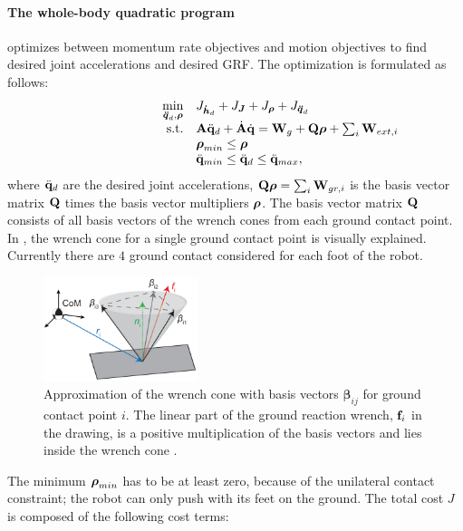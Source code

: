 \paragraph{The whole-body quadratic program} \cite{koolen2016design} optimizes between momentum rate objectives and motion objectives to find desired joint accelerations and desired \ac{GRF}. The optimization is formulated as follows:
\begin{equation}
\begin{array}{rlcl}
\displaystyle \min_{\bs{\ddot{q}}_d,\bs{\rho}} & \multicolumn{3}{l}{J_{\bs{\dot{h}}_d} + J_{\bs{J}} + J_{\bs{\rho}} + J_{\bs{\ddot{q}}_d} } \\%
\textrm{s.t.} & \matr{A}\ddqjntd + \dot{\matr{A}}\dqjnt = \matr{W}_g + \matr{Q}\bs{\rho}+\sum_i\matr{W}_{ext,i}\\
&\displaystyle \bs{\rho}_{min} \leq \bs{\rho}\\
&\ddot{\qjnt}_{min} \leq \ddqjntd \leq \ddot{\qjnt}_{max},
\end{array}
\end{equation}
where $\ddot{\mathbf{q}}_d$ are the desired joint accelerations, $\mathbf{Q}\boldsymbol{\rho} = \sum_i\mathbf{W}_{gr,i}$ is the basis vector matrix $\mathbf{Q}$ times the basis vector multipliers $\boldsymbol{\rho}$. The basis vector matrix $\mathbf{Q}$ consists of all basis vectors of the wrench cones from each ground contact point. In , the wrench cone for a single ground contact point is visually explained. Currently there are $4$ ground contact considered for each foot of the robot.
\begin{figure}
\centering
\includegraphics[width=0.4\textwidth]{STYLESTUFF/wrenchcone.png}
\caption{Approximation of the wrench cone with basis vectors $\boldsymbol{\beta}_{ij}$ for ground contact point $i$. The linear part of the ground reaction wrench, $\mathbf{f}_i$ in the drawing, is a positive multiplication of the basis vectors and lies inside the wrench cone \cite{koolen2016design}. }
\label{fig:wrenchcone}
\end{figure}
The minimum $\boldsymbol{\rho}_{min}$ has to be at least zero, because of the unilateral contact constraint; the robot can only push with its feet on the ground. The total cost $J$ is composed of the following cost terms:
